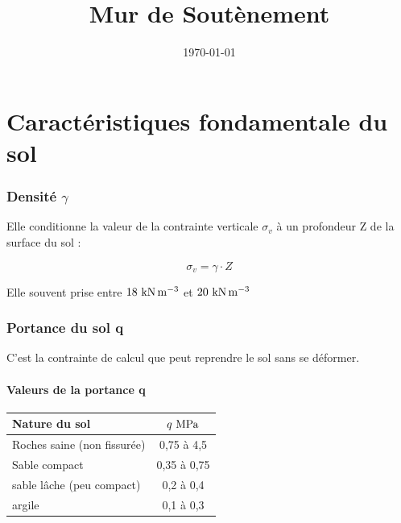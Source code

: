 \documentclass[12pt,a4paper]{article}
\title{Mur de Soutènement}
\author{}
\date{\today}
\begin{document}
	
	
	\tableofcontents
	
	\newpage
	
	
	
	\part{Caractéristiques fondamentale du sol}
	
	
	\section{Densité $\gamma$}
	
	Elle conditionne la valeur de la contrainte verticale $\sigma_{v}$ à un profondeur Z de la surface du sol :
	
	\[ \sigma_{v} = \gamma \cdot Z \]
	
	Elle souvent prise entre $18\knmc$ et $20\knmc$
	
	
	\section{Portance du sol q}
	
	C'est la contrainte de calcul que peut reprendre le sol sans se déformer.
	
	\subsection{Valeurs de la portance q}
	
	\begin{table}[H]
		\begin{center}
			\begin{tabular}{l|c}
				Nature du sol & $q\mpa$ \\ \hline
				Roches saine (non fissurée) & 0,75 à 4,5 \\
				Sable compact & 0,35 à 0,75 \\
				sable lâche (peu compact) & 0,2 à 0,4 \\
				argile & 0,1 à 0,3
			\end{tabular}
		\end{center}
	\end{table}
	
\end{document}
